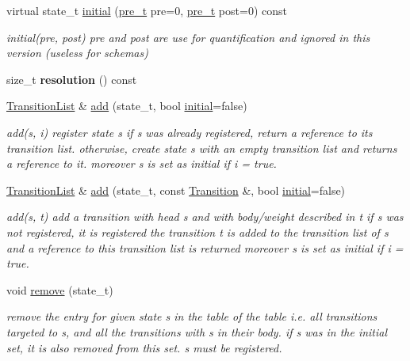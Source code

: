 \begin{DoxyCompactItemize}
virtual state\+\_\+t \mbox{\hyperlink{classWTA_ae6b10f70925f14f36b839e5d8657bc5e}{initial}} (\mbox{\hyperlink{group__general_ga092fe8b972dfa977c2a0886720a7731e}{pre\+\_\+t}} pre=0, \mbox{\hyperlink{group__general_ga092fe8b972dfa977c2a0886720a7731e}{pre\+\_\+t}} post=0) const
\begin{DoxyCompactList}\small\item\em initial(pre, post) pre and post are use for quantification and ignored in this version (useless for schemas) \end{DoxyCompactList}\item 
size\+\_\+t {\bfseries resolution} () const
\item 
\mbox{\hyperlink{classTransitionList}{Transition\+List}} \& \mbox{\hyperlink{group__schemata_ga924a1c533383a7185b9d466b59c5a495}{add}} (state\+\_\+t, bool \mbox{\hyperlink{classWTA_ae6b10f70925f14f36b839e5d8657bc5e}{initial}}=false)
\begin{DoxyCompactList}\small\item\em add(s, i) register state s if s was already registered, return a reference to its transition list. otherwise, create state s with an empty transition list and returns a reference to it. moreover s is set as initial if i = true. \end{DoxyCompactList}\item 
\mbox{\hyperlink{classTransitionList}{Transition\+List}} \& \mbox{\hyperlink{group__schemata_ga01de1e03d09518b38ab69a2075276ae2}{add}} (state\+\_\+t, const \mbox{\hyperlink{classTransition}{Transition}} \&, bool \mbox{\hyperlink{classWTA_ae6b10f70925f14f36b839e5d8657bc5e}{initial}}=false)
\begin{DoxyCompactList}\small\item\em add(s, t) add a transition with head s and with body/weight described in t if s was not registered, it is registered the transition t is added to the transition list of s and a reference to this transition list is returned moreover s is set as initial if i = true. \end{DoxyCompactList}\item 
void \mbox{\hyperlink{group__schemata_ga3d8d24249e26ecc8bbdaf672c6e8d3cf}{remove}} (state\+\_\+t)
\begin{DoxyCompactList}\small\item\em remove the entry for given state s in the table of the table i.\+e. all transitions targeted to s, and all the transitions with s in their body. if s was in the initial set, it is also removed from this set. s must be registered. \end{DoxyCompactList}\item 

\end{DoxyCompactItemize}
